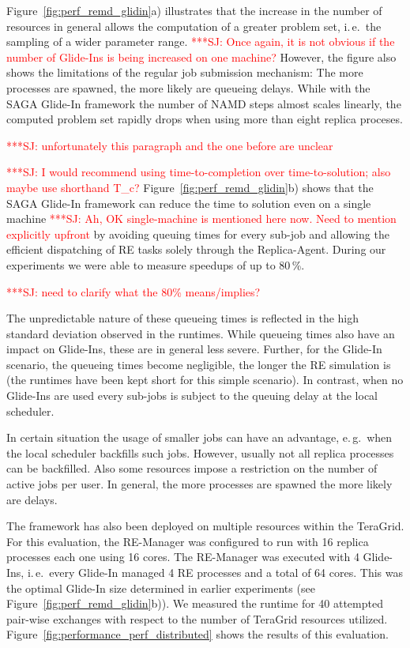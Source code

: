 \documentclass{rspublic}
\newcommand{\jhanote}[1]{ {\textcolor{red} { ***SJ: #1 }}}
\newcommand{\jhanote}[1]{}
\begin{document}
{Figure~\ref{fig:perf_remd_glidin}a) illustrates that the increase in
the number of resources in general allows the computation of a greater
problem set, i.\,e.\ the sampling of a wider parameter range.
\jhanote{Once again, it is not obvious if the number of Glide-Ins is
  being increased on one machine?}  However, the figure also shows the
limitations of the regular job submission mechanism: The more
processes are spawned, the more likely are queueing delays. While with
the SAGA Glide-In framework the number of NAMD steps almost scales
linearly, the computed problem set rapidly drops when using more than
eight replica proceses.

\jhanote{unfortunately this paragraph and the one before are unclear}

\jhanote{I would recommend using time-to-completion over
  time-to-solution; also maybe use shorthand T\_c?}
Figure~\ref{fig:perf_remd_glidin}b) shows that the SAGA Glide-In
framework can reduce the time to solution even on a single machine
\jhanote{Ah, OK single-machine is mentioned here now. Need to mention
  explicitly upfront} by avoiding queuing times for every sub-job and
allowing the efficient dispatching of RE tasks solely through the
Replica-Agent. During our experiments we were able to measure speedups
of up to 80\,\%.

\jhanote{need to clarify what the 80\% means/implies?}

The unpredictable nature of these queueing times is reflected in the
high standard deviation observed in the runtimes. While queueing times
also have an impact on Glide-Ins, these are in general less severe.
Further, for the Glide-In scenario, the queueing times become
negligible, the longer the RE simulation is (the runtimes have been
kept short for this simple scenario). In contrast, when no Glide-Ins
are used every sub-jobs is subject to the queuing delay at the local
scheduler.
                                                           
In certain situation the usage of smaller jobs can have an advantage,
e.\,g.\ when the local scheduler backfills such jobs. However, usually
not all replica processes can be backfilled. Also some resources
impose a restriction on the number of active jobs per user.  In
general, the more processes are spawned the more likely are delays.

The framework has also been deployed on multiple resources within the
TeraGrid.  For this evaluation, the RE-Manager was configured to run
with 16 replica processes each one using 16 cores.  The RE-Manager was
executed with 4 Glide-Ins, i.\,e.\ every Glide-In managed 4 RE
processes and a total of 64 cores.  This was the optimal Glide-In size
determined in earlier experiments (see
Figure~\ref{fig:perf_remd_glidin}b)).  We measured the runtime for 40
attempted pair-wise exchanges with respect to the number of TeraGrid
resources utilized. Figure~\ref{fig:performance_perf_distributed}
shows the results of this evaluation.

}
\end{document}
